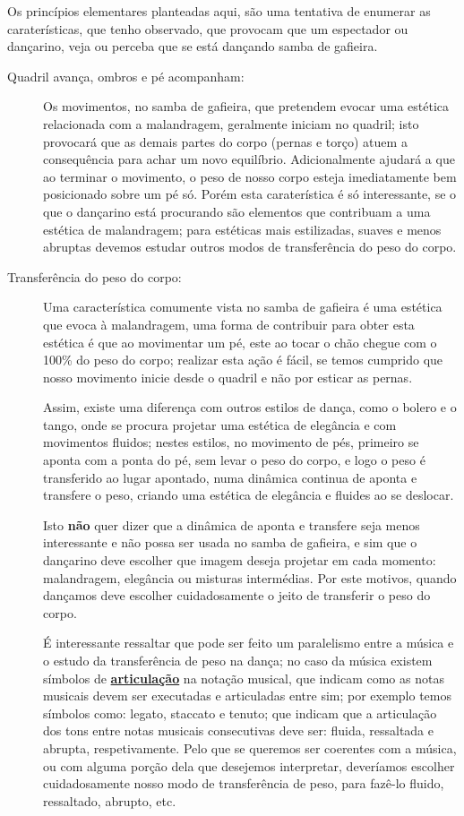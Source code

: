Os princípios elementares planteadas aqui, são uma tentativa de enumerar as caraterísticas,
que tenho observado, que provocam que um espectador ou dançarino,
veja ou perceba que se está dançando samba de gafieira.
\begin{description}
\item[Quadril avança, ombros e pé acompanham:]  Os movimentos, no samba de gafieira, 
que pretendem evocar uma estética relacionada com a malandragem,  geralmente iniciam no quadril;
isto provocará que as demais partes do corpo (pernas e torço) atuem a consequência para achar um novo equilíbrio.
Adicionalmente ajudará a que ao terminar o movimento, o peso de nosso corpo esteja imediatamente bem posicionado sobre um pé só.
Porém esta caraterística é só interessante, 
se o que o dançarino está procurando são elementos que contribuam a uma estética de malandragem;
para estéticas mais estilizadas, suaves e menos abruptas devemos estudar outros modos de transferência do peso do corpo.

\item[Transferência do peso do corpo:] %
Uma característica comumente vista no samba de gafieira é uma estética que evoca à malandragem, 
uma forma de contribuir para obter esta estética é que ao movimentar um pé, 
este ao tocar o chão chegue com o 100\% do peso do corpo; realizar esta ação é fácil, 
se temos cumprido que nosso movimento inicie desde o quadril e não por esticar as pernas.

Assim, existe uma diferença com outros estilos de dança, 
como o bolero e o tango, 
onde se procura projetar uma estética de elegância e com movimentos fluidos;
nestes estilos, no movimento de pés, primeiro se aponta com a ponta do pé, sem levar o peso do corpo,
 e logo o peso é transferido ao lugar apontado, numa dinâmica continua de aponta e transfere o peso,
criando uma estética de elegância e fluides ao se deslocar.

Isto \textbf{não} quer dizer que a dinâmica de aponta e transfere seja menos interessante e não possa ser usada no samba de gafieira,
e sim que o dançarino deve escolher que imagem deseja projetar em cada momento:
malandragem, elegância ou misturas intermédias. 
Por este motivos, quando dançamos deve escolher cuidadosamente o jeito de transferir o peso do corpo. 

É interessante ressaltar que pode ser feito um paralelismo entre a música e o estudo da transferência de peso na dança;
no caso da música existem símbolos de \hyperref[sub:Articulation]{\textbf{articulação}} na notação musical, 
que indicam como as notas musicais devem ser executadas e articuladas entre sim;
por exemplo temos símbolos como: legato, staccato e tenuto;
que indicam que a articulação dos tons entre notas musicais consecutivas deve ser: fluida, ressaltada e  abrupta, respetivamente.
Pelo que se queremos ser coerentes com a música, 
ou com alguma porção dela que desejemos interpretar,
deveríamos escolher cuidadosamente nosso modo de transferência de peso,
para fazê-lo fluido, ressaltado, abrupto, etc.



\end{description}
